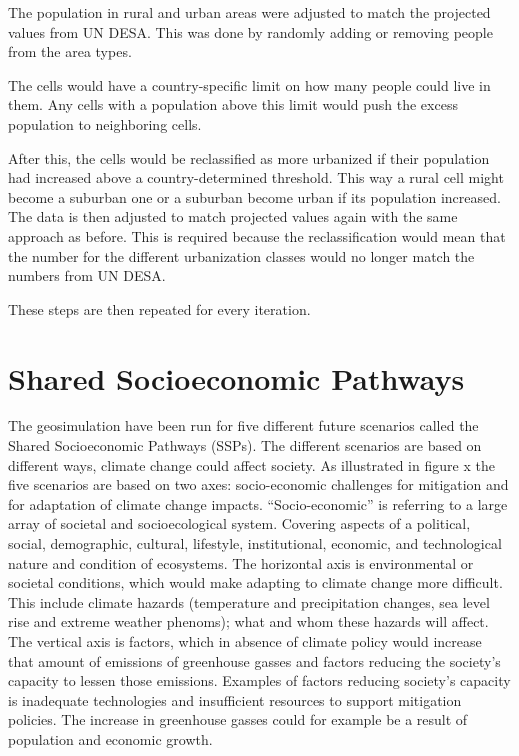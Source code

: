 The population in rural and urban areas were adjusted to match the projected values from UN DESA. This was done by randomly adding or removing people from the area types. 

The cells would have a country-specific limit on how many people could live in them. Any cells with a population above this limit would push the excess population to neighboring cells. 

After this, the cells would be reclassified as more urbanized if their population had increased above a country-determined threshold. This way a rural cell might become a suburban one or a suburban become urban if its population increased. The data is then adjusted to match projected values again with the same approach as before. This is required because the reclassification would mean that the number for the different urbanization classes would no longer match the numbers from UN DESA.

These steps are then repeated for every iteration. 

\citep{Kessler}
\section{Shared Socioeconomic Pathways}



The geosimulation have been run for five different future scenarios called the Shared Socioeconomic Pathways (SSPs). The different scenarios are based on different ways, climate change could affect society. As illustrated in figure x the five scenarios are based on two axes: socio-economic challenges for mitigation and for adaptation of climate change impacts. 
“Socio-economic” is referring to a large array of societal and socioecological system. Covering aspects of a political, social, demographic, cultural, lifestyle, institutional, economic, and technological nature and condition of ecosystems. 
The horizontal axis is environmental or societal conditions, which would make adapting to climate change more difficult. This include climate hazards (temperature and precipitation changes, sea level rise and extreme weather phenoms); what and whom these hazards will affect.
\citep{ConceptSSP}
The vertical axis is factors, which in absence of climate policy would increase that amount of emissions of greenhouse gasses and factors reducing the society’s capacity to lessen those emissions. Examples of factors reducing society’s capacity is inadequate technologies and insufficient resources to support mitigation policies. The increase in greenhouse gasses could for example be a result of population and economic growth.
\citep{SSP}

